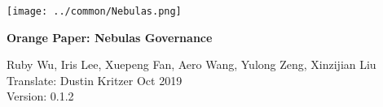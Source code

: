 \documentclass[12pt]{article}
\begin{document}
\pagestyle{empty}

\pagecolor{\pcolor}

\begin{titlepage}
  \begin{center}
    \vspace*{5.5cm}
    \texttt{[image: ../common/Nebulas.png]}
    \vspace{0.5cm}


    \textbf{\huge{Orange Paper: Nebulas Governance}}

    \vspace{0.5cm}
    Ruby Wu, Iris Lee, Xuepeng Fan, Aero Wang, Yulong Zeng, Xinzijian Liu \\
    Translate: Dustin Kritzer
    \vfill
    Oct 2019\\
    Version: 0.1.2
    \textbf{}
  \end{center}

\end{titlepage}
\setcounter{page}{0}
\tableofcontents
\newpage
\setcounter{page}{1}
\pagestyle{fancy}
\vspace*{0.01cm}





\newpage


\newpage
\begin{appendices}


\newpage

\end{appendices}
\end{document}
